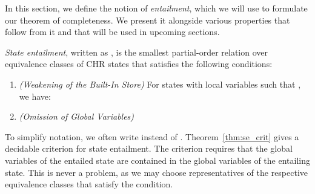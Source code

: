 \documentclass[acmtocl]{acmtrans2m}
\begin{document}
In this section, we define the notion of \emph{entailment}, which we will use to
formulate our theorem of completeness. We present it alongside various properties
that follow from it and that will be used in upcoming sections.

\begin{definition}
\label{def:s_entail}

\emph{State entailment}, written as , is the smallest
partial-order relation over equivalence classes of CHR states that satisfies the
following conditions:

\begin{enumerate}
	\item \label{cond:sn_wea} \emph{(Weakening of the Built-In Store)} For states  with  local variables  such that
	, we have:
	
	\item \label{cond:sn_omit} \emph{(Omission of Global Variables)}
	

\end{enumerate}
\end{definition}

To simplify notation, we often write  instead of .
Theorem~\ref{thm:se_crit} gives a decidable criterion for state entailment. The
criterion requires that the global variables of the entailed state are contained
in the global variables of the entailing state. This is never a problem, as we
may choose representatives of the respective equivalence classes that satisfy the
condition.
\end{document}
